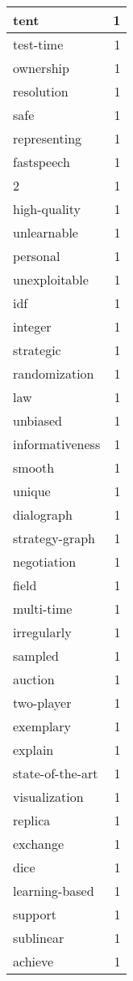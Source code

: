 \begin{table}[h]
\begin{tabular}{|l|r|}
\hline
tent & 1 \\
\hline
test-time & 1 \\
\hline
ownership & 1 \\
\hline
resolution & 1 \\
\hline
safe & 1 \\
\hline
representing & 1 \\
\hline
fastspeech & 1 \\
\hline
2 & 1 \\
\hline
high-quality & 1 \\
\hline
unlearnable & 1 \\
\hline
personal & 1 \\
\hline
unexploitable & 1 \\
\hline
idf & 1 \\
\hline
integer & 1 \\
\hline
strategic & 1 \\
\hline
randomization & 1 \\
\hline
law & 1 \\
\hline
unbiased & 1 \\
\hline
informativeness & 1 \\
\hline
smooth & 1 \\
\hline
unique & 1 \\
\hline
dialograph & 1 \\
\hline
strategy-graph & 1 \\
\hline
negotiation & 1 \\
\hline
field & 1 \\
\hline
multi-time & 1 \\
\hline
irregularly & 1 \\
\hline
sampled & 1 \\
\hline
auction & 1 \\
\hline
two-player & 1 \\
\hline
exemplary & 1 \\
\hline
explain & 1 \\
\hline
state-of-the-art & 1 \\
\hline
visualization & 1 \\
\hline
replica & 1 \\
\hline
exchange & 1 \\
\hline
dice & 1 \\
\hline
learning-based & 1 \\
\hline
support & 1 \\
\hline
sublinear & 1 \\
\hline
achieve & 1 \\

\end{tabular}
\end{table}
